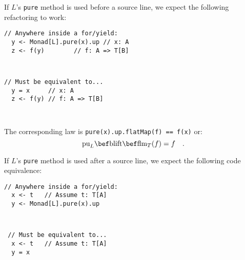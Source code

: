 If $L$\textsf{'}s \lstinline!pure! method is used before a source line, we
expect the following refactoring to work:

\vspace{-0.6\baselineskip}

\noindent \texttt{\textcolor{blue}{\footnotesize{}}}%
\begin{minipage}[t]{0.48\columnwidth}%
\textcolor{darkgray}{\footnotesize{}}
\begin{lstlisting}
// Anywhere inside a for/yield:
  y <- Monad[L].pure(x).up // x: A
  z <- f(y)        // f: A => T[B]
\end{lstlisting}
%
\end{minipage}\texttt{\textcolor{blue}{\footnotesize{}\hspace*{\fill} }}%
\begin{minipage}[t]{0.48\columnwidth}%
\texttt{\textcolor{blue}{\footnotesize{}}}
\begin{lstlisting}
// Must be equivalent to...
  y = x     // x: A
  z <- f(y) // f: A => T[B]
\end{lstlisting}
%
\end{minipage}\texttt{\textcolor{blue}{\footnotesize{}\smallskip{}
}}{\footnotesize\par}

The corresponding law is \lstinline!pure(x).up.flatMap(f) == f(x)!
or:
\[
\text{pu}_{L}\bef\text{blift}\bef\text{flm}_{T}(f)=f\quad.
\]

If $L$\textsf{'}s \lstinline!pure! method is used after a source line, we
expect the following code equivalence:

\vspace{-0.5\baselineskip}

\noindent \texttt{\textcolor{blue}{\footnotesize{}}}%
\begin{minipage}[t]{0.48\columnwidth}%
\textcolor{darkgray}{\footnotesize{}}
\begin{lstlisting}
// Anywhere inside a for/yield:
  x <- t   // Assume t: T[A]
  y <- Monad[L].pure(x).up
\end{lstlisting}
%
\end{minipage}\texttt{\textcolor{blue}{\footnotesize{}\hspace*{\fill} }}%
\begin{minipage}[t]{0.48\columnwidth}%
\texttt{\textcolor{blue}{\footnotesize{}}}
\begin{lstlisting}
 // Must be equivalent to...
  x <- t   // Assume t: T[A]
  y = x
\end{lstlisting}
%
\end{minipage}\texttt{\textcolor{blue}{\footnotesize{}\smallskip{}
}}{\footnotesize\par}

